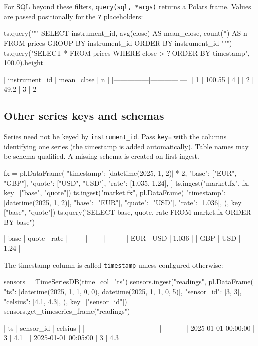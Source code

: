 \documentclass[11pt,a4paper]{article}
\newcommand{\code}[1]{\texttt{#1}}
\begin{document}
For SQL beyond these filters, \code{query(sql, *args)} returns a Polars frame. Values are
passed positionally for the \code{?} placeholders:

\begin{python}
ts.query("""
    SELECT instrument_id, avg(close) AS mean_close, count(*) AS n
    FROM prices GROUP BY instrument_id ORDER BY instrument_id
""")
ts.query("SELECT * FROM prices WHERE close > ? ORDER BY timestamp", 100.0).height
\end{python}
\begin{console}
| instrument_id | mean_close | n |
|---------------|------------|---|
| 1             | 100.55     | 4 |
| 2             | 49.2       | 3 |
2
\end{console}

\subsection{Other series keys and schemas}

Series need not be keyed by \code{instrument\_id}. Pass \code{key=} with the columns
identifying one series (the timestamp is added automatically). Table names may be
schema-qualified. A missing schema is created on first ingest.

\begin{python}
fx = pl.DataFrame({
    "timestamp": [datetime(2025, 1, 2)] * 2,
    "base": ["EUR", "GBP"], "quote": ["USD", "USD"], "rate": [1.035, 1.24],
})
ts.ingest("market.fx", fx, key=["base", "quote"])
ts.ingest("market.fx", pl.DataFrame({
    "timestamp": [datetime(2025, 1, 2)], "base": ["EUR"], "quote": ["USD"], "rate": [1.036],
}), key=["base", "quote"])
ts.query("SELECT base, quote, rate FROM market.fx ORDER BY base")
\end{python}
\begin{console}
| base | quote | rate  |
|------|-------|-------|
| EUR  | USD   | 1.036 |
| GBP  | USD   | 1.24  |
\end{console}

The timestamp column is called \code{timestamp} unless configured otherwise:

\begin{python}
sensors = TimeSeriesDB(time_col="ts")
sensors.ingest("readings", pl.DataFrame({
    "ts": [datetime(2025, 1, 1, 0, 0), datetime(2025, 1, 1, 0, 5)],
    "sensor_id": [3, 3],
    "celsius": [4.1, 4.3],
}), key=["sensor_id"])
sensors.get_timeseries_frame("readings")
\end{python}
\begin{console}
| ts                  | sensor_id | celsius |
|---------------------|-----------|---------|
| 2025-01-01 00:00:00 | 3         | 4.1     |
| 2025-01-01 00:05:00 | 3         | 4.3     |
\end{console}
\end{document}
